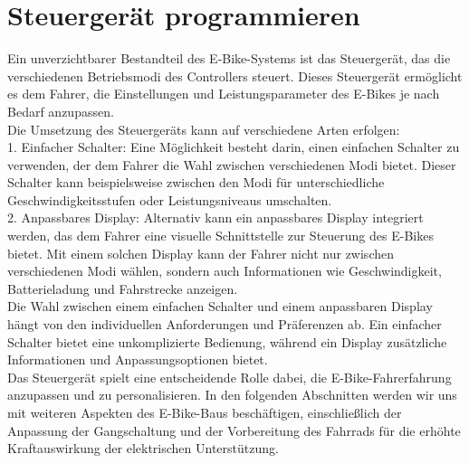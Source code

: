 
\chapter{Steuergerät programmieren}
Ein unverzichtbarer Bestandteil des E-Bike-Systems ist das Steuergerät, das die verschiedenen Betriebsmodi des Controllers steuert. Dieses Steuergerät ermöglicht es dem Fahrer, die Einstellungen und Leistungsparameter des E-Bikes je nach Bedarf anzupassen.\\

Die Umsetzung des Steuergeräts kann auf verschiedene Arten erfolgen:\\

    1. Einfacher Schalter: Eine Möglichkeit besteht darin, einen einfachen Schalter zu verwenden, der dem Fahrer die Wahl zwischen verschiedenen Modi bietet. Dieser Schalter kann beispielsweise zwischen den Modi für unterschiedliche Geschwindigkeitsstufen oder Leistungsniveaus umschalten.\\

    2. Anpassbares Display: Alternativ kann ein anpassbares Display integriert werden, das dem Fahrer eine visuelle Schnittstelle zur Steuerung des E-Bikes bietet. Mit einem solchen Display kann der Fahrer nicht nur zwischen verschiedenen Modi wählen, sondern auch Informationen wie Geschwindigkeit, Batterieladung und Fahrstrecke anzeigen.\\

Die Wahl zwischen einem einfachen Schalter und einem anpassbaren Display hängt von den individuellen Anforderungen und Präferenzen ab. Ein einfacher Schalter bietet eine unkomplizierte Bedienung, während ein Display zusätzliche Informationen und Anpassungsoptionen bietet.\\

Das Steuergerät spielt eine entscheidende Rolle dabei, die E-Bike-Fahrerfahrung anzupassen und zu personalisieren. In den folgenden Abschnitten werden wir uns mit weiteren Aspekten des E-Bike-Baus beschäftigen, einschließlich der Anpassung der Gangschaltung und der Vorbereitung des Fahrrads für die erhöhte Kraftauswirkung der elektrischen Unterstützung.\\
